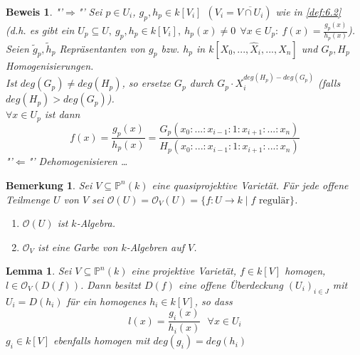 \documentclass[a4paper,12pt]{report}
\theoremstyle{break}
\newtheorem{Bem}[Def]{Bemerkung}
\newtheorem{Lemma}{Lemma}
\theoremstyle{nonumberbreak}
\theoremstyle{nonumberplain}
\newtheorem{Bew}{Beweis}
\begin{document}
\begin{Bew} "'$\Rightarrow$"' Sei $p\in U_i$, $g_p,h_p\in k[V_i]~~(V_i=\overline{V\cap U_i})$ wie in \ref{def:6.2} (d.h. es gibt ein $U_p\subseteq U,~g_p,h_p\in k[V_i],~h_p(x)\neq 0 ~~\forall x\in U_p: ~f(x)=\frac{g_p(x)}{h_p(x)}$).\\
Seien $\tilde{g}_p, \tilde{h}_p$ Repräsentanten von $g_p$ bzw. $h_p$ in $k[X_0,...,\hat{X}_i,...,X_n]$ und $G_p, H_p$ Homogenisierungen.\\
Ist $deg(G_p)\neq deg(H_p)$, so ersetze $G_p$ durch $G_p\cdot X_i^{deg(H_p)-deg(G_p)}$ (falls $deg(H_p)>deg(G_p)$).\\
$\forall x\in U_p$ ist dann $$f(x)=\frac{g_p(x)}{h_p(x)}=\frac{G_p(x_0:...:x_{i-1}:1:x_{i+1}:...:x_n)}{H_p(x_0:...:x_{i-1}:1:x_{i+1}:...:x_n)}$$
"'$\Leftarrow$"' Dehomogenisieren \dots
\end{Bew}

\begin{Bem}
Sei $V\subseteq\mathbb{P}^n(k)$ eine quasiprojektive Varietät. Für jede offene Teilmenge $U$ von $V$ sei $\mathcal{O}(U)=\mathcal{O}_V(U)=\{f: U\rightarrow k \mid f \text{ regulär} \}$.
\begin{enumerate}
\item $\mathcal{O}(U)$ ist $k$-Algebra.
\item $\mathcal{O}_V$ ist eine Garbe von $k$-Algebren auf $V$.
\end{enumerate}
\end{Bem}

\begin{Lemma}
\label{}
Sei $V\subseteq\mathbb{P}^n(k)$ eine projektive Varietät, $f\in k[V]$ homogen, $l\in \mathcal O_V(D(f))$. Dann besitzt $D(f)$ eine offene Überdeckung $(U_i)_{i\in J}$ mit $U_i=D(h_i)$ für ein homogenes $h_i\in k[V]$, so dass
$$l(x)=\frac{g_i(x)}{h_i(x)}~~~\forall x\in U_i$$
$g_i\in k[V]$ ebenfalls homogen mit $deg(g_i)=deg(h_i)$
\end{Lemma}
\end{document}
